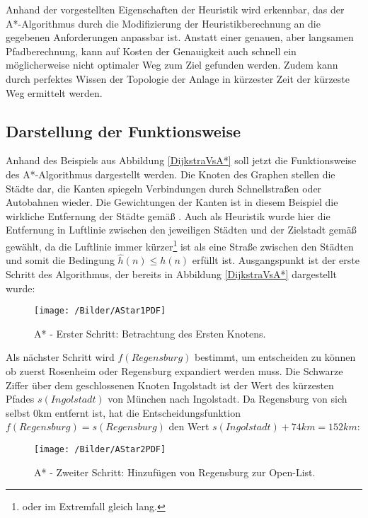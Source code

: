		Anhand der vorgestellten Eigenschaften der Heuristik wird erkennbar, das der A*-Algorithmus durch die Modifizierung der Heuristikberechnung an die gegebenen Anforderungen anpassbar ist. Anstatt einer genauen, aber langsamen Pfadberechnung, kann auf Kosten der Genauigkeit auch schnell ein möglicherweise nicht optimaler Weg zum Ziel gefunden werden. Zudem kann durch perfektes Wissen der Topologie der Anlage in kürzester Zeit der kürzeste Weg ermittelt werden.
	
	\subsection{Darstellung der Funktionsweise}
		Anhand des Beispiels aus Abbildung \ref{DijkstraVsA*} soll jetzt die Funktionsweise des A*-Algorithmus dargestellt werden. Die Knoten des Graphen stellen die Städte dar, die Kanten spiegeln Verbindungen  durch Schnellstraßen oder Autobahnen wieder. Die Gewichtungen der Kanten ist in diesem Beispiel die wirkliche Entfernung der Städte gemäß \cite{Luftlinie}. Auch als Heuristik wurde hier die Entfernung in Luftlinie zwischen den jeweiligen Städten und der Zielstadt gemäß \cite{Luftlinie} gewählt, da die Luftlinie immer kürzer\footnote{oder im Extremfall gleich lang.} ist als eine Straße zwischen den Städten und somit die Bedingung $\hat{h}(n)\le h(n)$ erfüllt ist. Ausgangspunkt ist der erste Schritt des Algorithmus, der bereits in Abbildung \ref{DijkstraVsA*} dargestellt wurde:  
		
		\begin{figure}[H]
			\centering
			\texttt{[image: /Bilder/AStar1PDF]}
			\vspace{0.2cm}
			\caption{A* - Erster Schritt: Betrachtung des Ersten Knotens.}
		\end{figure}
		
		Als nächster Schritt wird $\hat{f}(Regensburg)$ bestimmt, um entscheiden zu können ob zuerst Rosenheim oder Regensburg expandiert werden muss. Die Schwarze Ziffer über dem geschlossenen Knoten Ingolstadt ist der  Wert des kürzesten Pfades $s(Ingolstadt)$ von München nach Ingolstadt. Da Regensburg von sich selbst 0km entfernt ist, hat die Entscheidungsfunktion $f(Regensburg)=s(Regensburg)$ den Wert $s(Ingolstadt)+74km=152km$:
		
		\begin{figure}[H]
			\centering
			\texttt{[image: /Bilder/AStar2PDF]}
			\vspace{0.2cm}
			\caption{A* - Zweiter Schritt: Hinzufügen von Regensburg zur Open-List.}
		\end{figure}
		
